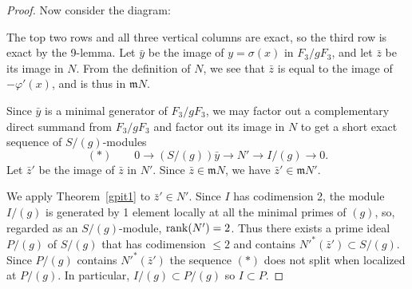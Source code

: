 \documentclass[11pt]{amsart}
\def\phi{{\varphi}}
\def\gm{{\mathfrak m}}
\begin{document}
\begin{proof}
Now consider the  diagram:
\begin{tiny}
\begin{center}
\end{center}
\end{tiny}
    
The top two rows and all three vertical columns are exact, so the third row is exact by the 9-lemma.
Let $\bar y$ be the image of $y = \sigma(x)$ in $F_3/gF_3$, and let $\bar z$ be its image in $N$.
From the definition
of $N$, we see that  $\bar z$ is equal to the image
of $-\phi'(x)$, and is thus in $\gm N$.

Since $\bar y$ is a minimal generator of $F_3/gF_3$, we may factor out a complementary direct summand
from $F_3/gF_3$ and factor out its image in $N$ to get a short exact sequence of $S/(g)$-modules
$$
(*)\qquad 0\to (S/(g))\bar y\to N' \to I/(g) \to 0.
$$
 Let $\bar z'$ be the image of $\bar z$ in $N'$. Since $\bar z \in \gm N$, we have $\bar z' \in \gm N'$. 

We apply Theorem~\ref{gpit1} to $\bar z' \in N'$. Since $I$ has codimension 2, the module $I/(g)$ is generated by 1 element locally
at all the minimal primes of $(g)$, so, regarded as an $S/(g)$-module, $\operatorname{rank}(N') = 2$.
Thus there exists a prime ideal $P/(g)$ of $S/(g)$ that has codimension $\leq 2$ and contains $N'^*(\bar z') \subset S/(g)$. Since $P/(g)$ contains $N'^*(\bar z')$ the sequence $(*)$ does not split when localized at $P/(g)$.
In particular, $I/(g) \subset P/(g)$ so $I\subset P$.


\end{proof}
\end{document}
